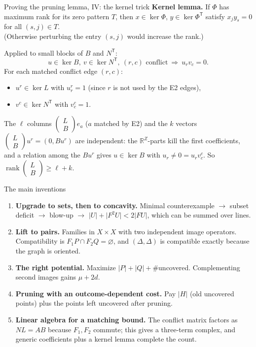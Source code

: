 \documentclass[aspectratio=169,11pt]{beamer}
\newcommand{\abs}[1]{\lvert #1\rvert}
\newcommand{\RR}{\mathbb R}
\newcommand{\LB}{\left(\begin{smallmatrix}L\\ B\end{smallmatrix}\right)}
\DeclareMathOperator{\rank}{rank}
\begin{document}
\begin{frame}{Proving the pruning lemma, IV: the kernel trick}
\textbf{Kernel lemma.} If $\Phi$ has maximum rank for its zero pattern $T$, then
$x\in\ker\Phi$, $y\in\ker\Phi^{\mathsf T}$ satisfy $x_jy_s=0$ for all $(s,j)\in T$.
\\{\small (Otherwise perturbing the entry $(s,j)$ would increase the rank.)}

\medskip
Applied to small blocks of $B$ and $N^{\mathsf T}$:
\[
 u\in\ker B,\ v\in\ker N^{\mathsf T},\ (r,c)\text{ conflict}\ \Longrightarrow\ u_rv_c=0.
\]
For each matched conflict edge $(r,c)$:
\begin{itemize}
\item $u^r\in\ker L$ with $u^r_r=1$ (since $r$ is not used by the E2 edges),
\item $v^c\in\ker N^{\mathsf T}$ with $v^c_c=1$.
\end{itemize}
The $\ell$ columns $\LB e_a$ ($a$ matched by E2) and the $k$ vectors $\LB u^r=(0,Bu^r)$
are independent: the $\RR^Z$-parts kill the first coefficients, and a relation among
the $Bu^r$ gives $u\in\ker B$ with $u_r\ne0=u_rv^c_c$. So $\rank\LB\ge\ell+k$.
\end{frame}

\begin{frame}{The main inventions}
\begin{enumerate}
\item \textbf{Upgrade to sets, then to concavity.} Minimal counterexample $\to$
subset deficit $\to$ blow-up $\to$ $\abs U+\abs{F^2U}<2\abs{FU}$, which can be
summed over lines.
\item \textbf{Lift to pairs.} Families in $X\times X$ with two independent
image operators. Compatibility is $F_1P\cap F_2Q=\varnothing$, and $(\Delta,\Delta)$ is
compatible exactly because the graph is oriented.
\item \textbf{The right potential.} Maximize $\abs P+\abs Q+\#$uncovered.
Complementing second images gains $\mu+2d$.
\item \textbf{Pruning with an outcome-dependent cost.} Pay $\abs H$ (old uncovered
points) plus the points left uncovered after pruning.
\item \textbf{Linear algebra for a matching bound.} The conflict matrix factors as
$NL=AB$ because $F_1,F_2$ commute; this gives a three-term complex, and generic
coefficients plus a kernel lemma complete the count.
\end{enumerate}
\end{frame}
\end{document}
